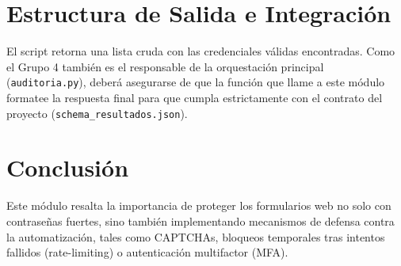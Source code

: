 \documentclass[12pt,a4paper]{article}
\begin{document}
\section*{Estructura de Salida e Integración}
El script retorna una lista cruda con las credenciales válidas encontradas. Como el Grupo 4 también es el responsable de la orquestación principal (\texttt{auditoria.py}), deberá asegurarse de que la función que llame a este módulo formatee la respuesta final para que cumpla estrictamente con el contrato del proyecto (\texttt{schema\_resultados.json}).

\section*{Conclusión}
Este módulo resalta la importancia de proteger los formularios web no solo con contraseñas fuertes, sino también implementando mecanismos de defensa contra la automatización, tales como CAPTCHAs, bloqueos temporales tras intentos fallidos (rate-limiting) o autenticación multifactor (MFA).
\end{document}
